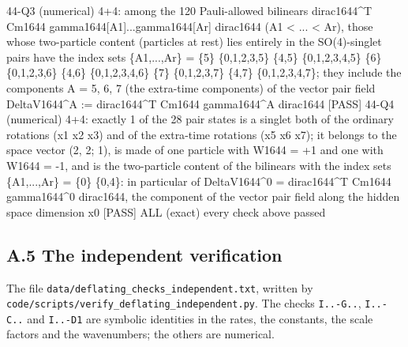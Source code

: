 \documentclass[
  10pt,
]{article}
\newenvironment{Shaded}{}{}
\newcommand{\NormalTok}[1]{#1}
\begin{document}
\begin{Shaded}
\begin{Highlighting}[]
\NormalTok{[PASS] 44{-}Q3  (numerical) 4+4: among the 120 Pauli{-}allowed bilinears dirac1644\^{}T Cm1644 gamma1644[A1]...gamma1644[Ar] dirac1644 (A1 \textless{} ... \textless{} Ar), those whose two{-}particle content (particles at rest) lies entirely in the SO(4){-}singlet pairs have the index sets \{A1,...,Ar\} = \{5\} \{0,1,2,3,5\} \{4,5\} \{0,1,2,3,4,5\} \{6\} \{0,1,2,3,6\} \{4,6\} \{0,1,2,3,4,6\} \{7\} \{0,1,2,3,7\} \{4,7\} \{0,1,2,3,4,7\}; they include the components A = 5, 6, 7 (the extra{-}time components) of the vector pair field DeltaV1644\^{}A := dirac1644\^{}T Cm1644 gamma1644\^{}A dirac1644}
\NormalTok{[PASS] 44{-}Q4  (numerical) 4+4: exactly 1 of the 28 pair states is a singlet both of the ordinary rotations (x1 x2 x3) and of the extra{-}time rotations (x5 x6 x7); it belongs to the space vector (2, 2; 1), is made of one particle with W1644 = +1 and one with W1644 = {-}1, and is the two{-}particle content of the bilinears with the index sets \{A1,...,Ar\} = \{0\} \{0,4\}: in particular of DeltaV1644\^{}0 = dirac1644\^{}T Cm1644 gamma1644\^{}0 dirac1644, the component of the vector pair field along the hidden space dimension x0}
\NormalTok{[PASS] ALL  (exact) every check above passed}
\end{Highlighting}
\end{Shaded}

\hypertarget{a.5-the-independent-verification}{%
\subsection{A.5 The independent
verification}\label{a.5-the-independent-verification}}

The file \texttt{data/deflating\_checks\_independent.txt}, written by
\texttt{code/scripts/verify\_deflating\_independent.py}. The checks
\texttt{I..-G..}, \texttt{I..-C..} and \texttt{I..-D1} are symbolic
identities in the rates, the constants, the scale factors and the
wavenumbers; the others are numerical.
\end{document}
